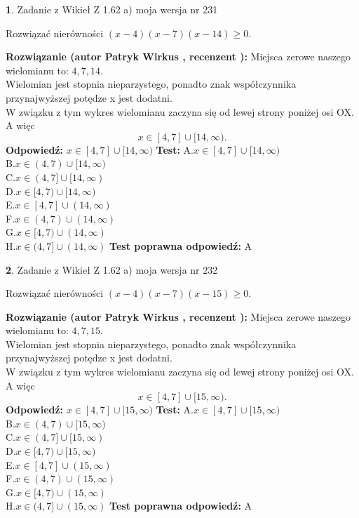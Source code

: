 \documentclass[12pt, a4paper]{article}
\theoremstyle{definition} %
\newtheorem{zad}{}
\newcommand{\zadStart}[1]{\begin{zad}#1\newline}
\newcommand{\zadStop}{\end{zad}}
\newcommand{\rozwStart}[2]{\noindent \textbf{Rozwiązanie (autor #1 , recenzent #2): }\newline}
\newcommand{\rozwStop}{\newline}
\newcommand{\odpStart}{\noindent \textbf{Odpowiedź:}\newline}
\newcommand{\odpStop}{\newline}
\newcommand{\testStart}{\noindent \textbf{Test:}\newline}
\newcommand{\testStop}{\newline}
\newcommand{\kluczStart}{\noindent \textbf{Test poprawna odpowiedź:}\newline}
\newcommand{\kluczStop}{\newline}
\begin{document}
\zadStart{Zadanie z Wikieł Z 1.62 a) moja wersja nr 231}

Rozwiązać nierówności $(x-4)(x-7)(x-14)\ge0$.
\zadStop
\rozwStart{Patryk Wirkus}{}
Miejsca zerowe naszego wielomianu to: $4, 7, 14$.\\
Wielomian jest stopnia nieparzystego, ponadto znak współczynnika przy\linebreak najwyższej potędze x jest dodatni.\\ W związku z tym wykres wielomianu zaczyna się od lewej strony poniżej osi OX. A więc $$x \in [4,7] \cup [14,\infty).$$
\rozwStop
\odpStart
$x \in [4,7] \cup [14,\infty)$
\odpStop
\testStart
A.$x \in [4,7] \cup [14,\infty)$\\
B.$x \in (4,7) \cup [14,\infty)$\\
C.$x \in (4,7] \cup [14,\infty)$\\
D.$x \in [4,7) \cup [14,\infty)$\\
E.$x \in [4,7] \cup (14,\infty)$\\
F.$x \in (4,7) \cup (14,\infty)$\\
G.$x \in [4,7) \cup (14,\infty)$\\
H.$x \in (4,7] \cup (14,\infty)$
\testStop
\kluczStart
A
\kluczStop



\zadStart{Zadanie z Wikieł Z 1.62 a) moja wersja nr 232}

Rozwiązać nierówności $(x-4)(x-7)(x-15)\ge0$.
\zadStop
\rozwStart{Patryk Wirkus}{}
Miejsca zerowe naszego wielomianu to: $4, 7, 15$.\\
Wielomian jest stopnia nieparzystego, ponadto znak współczynnika przy\linebreak najwyższej potędze x jest dodatni.\\ W związku z tym wykres wielomianu zaczyna się od lewej strony poniżej osi OX. A więc $$x \in [4,7] \cup [15,\infty).$$
\rozwStop
\odpStart
$x \in [4,7] \cup [15,\infty)$
\odpStop
\testStart
A.$x \in [4,7] \cup [15,\infty)$\\
B.$x \in (4,7) \cup [15,\infty)$\\
C.$x \in (4,7] \cup [15,\infty)$\\
D.$x \in [4,7) \cup [15,\infty)$\\
E.$x \in [4,7] \cup (15,\infty)$\\
F.$x \in (4,7) \cup (15,\infty)$\\
G.$x \in [4,7) \cup (15,\infty)$\\
H.$x \in (4,7] \cup (15,\infty)$
\testStop
\kluczStart
A
\kluczStop
\end{document}

